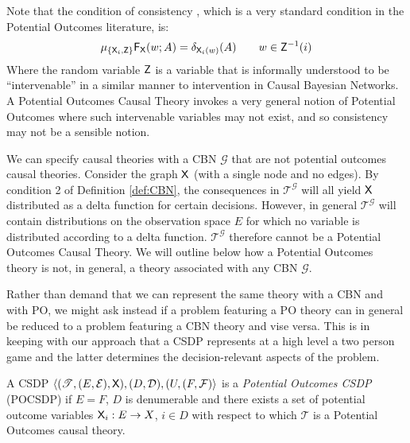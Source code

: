 Note that the condition of consistency \citep{richardson2013single}, which is a very standard condition in the Potential Outcomes literature, is:
\begin{align}
    \mu_{\{\mathsf{X}_i,\mathsf{Z}\}} \mathsf{F}_{\mathsf{X}} (w;A) = \delta_{\mathsf{X}_i(w)} (A) \qquad w\in \mathsf{Z}^{-1}(i)
\end{align}
Where the random variable $\mathsf{Z}$ is a variable that is informally understood to be ``intervenable'' in a similar manner to intervention in Causal Bayesian Networks. A Potential Outcomes Causal Theory invokes a very general notion of Potential Outcomes where such intervenable variables may not exist, and so consistency may not be a sensible notion.

We can specify causal theories with a CBN $\mathcal{G}$ that are not potential outcomes causal theories. Consider the graph $\mathsf{X}$ (with a single node and no edges). By condition 2 of Definition \ref{def:CBN}, the consequences in $\mathscr{T}^{\mathcal{G}}$ will all yield $\mathsf{X}$ distributed as a delta function for certain decisions. However, in general $\mathscr{T}^{\mathcal{G}}$ will contain distributions on the observation space $E$ for which no variable is distributed according to a delta function. $\mathscr{T}^{\mathcal{G}}$ therefore cannot be a Potential Outcomes Causal Theory. We will outline below how a Potential Outcomes theory is not, in general, a theory associated with any CBN $\mathcal{G}$.

Rather than demand that we can represent the same theory with a CBN and with PO, we might ask instead if a problem featuring a PO theory can in general be reduced to a problem featuring a CBN theory and vise versa. This is in keeping with our approach that a CSDP represents at a high level a two person game and the latter determines the decision-relevant aspects of the problem.


\begin{definition}
A CSDP $\langle (\mathscr{T},(E,\mathcal{E}),\mathsf{X}),(D,\mathcal{D}), (U,(F,\mathcal{F})\rangle$ is a \emph{Potential Outcomes CSDP} (POCSDP) if $E=F$, $D$ is denumerable and there exists a set of potential outcome variables $\mathsf{X}_i:E\to X$, $i\in D$ with respect to which $\mathscr{T}$ is a Potential Outcomes causal theory.
\end{definition}


